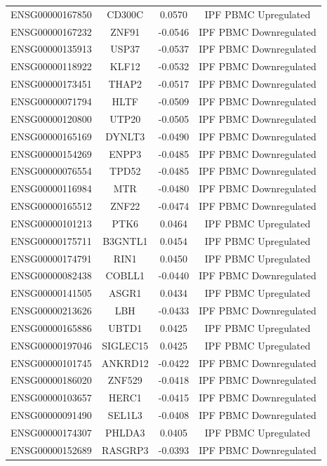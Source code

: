 \documentclass[
]{article}
\begin{document}
\begin{singlespace}
\begin{longtable}[t]{lccc}
ENSG00000167850 & CD300C & 0.0570 & IPF PBMC Upregulated\\
\addlinespace
ENSG00000167232 & ZNF91 & -0.0546 & IPF PBMC Downregulated\\
ENSG00000135913 & USP37 & -0.0537 & IPF PBMC Downregulated\\
ENSG00000118922 & KLF12 & -0.0532 & IPF PBMC Downregulated\\
ENSG00000173451 & THAP2 & -0.0517 & IPF PBMC Downregulated\\
ENSG00000071794 & HLTF & -0.0509 & IPF PBMC Downregulated\\
\addlinespace
ENSG00000120800 & UTP20 & -0.0505 & IPF PBMC Downregulated\\
ENSG00000165169 & DYNLT3 & -0.0490 & IPF PBMC Downregulated\\
ENSG00000154269 & ENPP3 & -0.0485 & IPF PBMC Downregulated\\
ENSG00000076554 & TPD52 & -0.0485 & IPF PBMC Downregulated\\
ENSG00000116984 & MTR & -0.0480 & IPF PBMC Downregulated\\
\addlinespace
ENSG00000165512 & ZNF22 & -0.0474 & IPF PBMC Downregulated\\
ENSG00000101213 & PTK6 & 0.0464 & IPF PBMC Upregulated\\
ENSG00000175711 & B3GNTL1 & 0.0454 & IPF PBMC Upregulated\\
ENSG00000174791 & RIN1 & 0.0450 & IPF PBMC Upregulated\\
ENSG00000082438 & COBLL1 & -0.0440 & IPF PBMC Downregulated\\
\addlinespace
ENSG00000141505 & ASGR1 & 0.0434 & IPF PBMC Upregulated\\
ENSG00000213626 & LBH & -0.0433 & IPF PBMC Downregulated\\
ENSG00000165886 & UBTD1 & 0.0425 & IPF PBMC Upregulated\\
ENSG00000197046 & SIGLEC15 & 0.0425 & IPF PBMC Upregulated\\
ENSG00000101745 & ANKRD12 & -0.0422 & IPF PBMC Downregulated\\
\addlinespace
ENSG00000186020 & ZNF529 & -0.0418 & IPF PBMC Downregulated\\
ENSG00000103657 & HERC1 & -0.0415 & IPF PBMC Downregulated\\
ENSG00000091490 & SEL1L3 & -0.0408 & IPF PBMC Downregulated\\
ENSG00000174307 & PHLDA3 & 0.0405 & IPF PBMC Upregulated\\
ENSG00000152689 & RASGRP3 & -0.0393 & IPF PBMC Downregulated\\

\end{longtable}
\end{singlespace}
\end{document}

